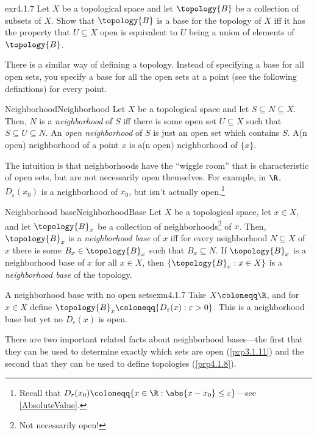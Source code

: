 \begin{exr}{}{exr4.1.7}
Let $X$ be a topological space and let $\topology{B}$ be a collection of subsets of $X$.  Show that $\topology{B}$ is a base for the topology of $X$ iff it has the property that $U\subseteq X$ open is equivalent to $U$ being a union of elements of $\topology{B}$.
\end{exr}
There is a similar way of defining a topology.  Instead of specifying a base for all open sets, you specify a base for all the open sets at a point (see the following definitions) for every point.
\begin{dfn}{Neighborhood}{Neighborhood}
Let $X$ be a topological space and let $S\subseteq N\subseteq X$.  Then, $N$ is a \emph{neighborhood} of $S$ iff there is some open set $U\subseteq X$ such that $S\subseteq U\subseteq N$.  An \emph{open neighborhood} of $S$ is just an open set which contains $S$.  A(n open) neighborhood of a point $x$ is a(n open) neighborhood of $\{ x\}$.
\begin{rmk}
The intuition is that neighborhoods have the ``wiggle room'' that is characteristic of open sets, but are not necessarily open themselves.  For example, in $\R$, $D_{\varepsilon}(x_0)$ is a neighborhood of $x_0$, but isn't actually open.\footnote{Recall that $D_{\varepsilon}(x_0)\coloneqq \{ x\in \R :\abs{x-x_0}\leq \varepsilon \}$---see \cref{AbsoluteValue}.}
\end{rmk}
\end{dfn}
\begin{dfn}{Neighborhood base}{NeighborhoodBase}
Let $X$ be a topological space, let $x\in X$, and let $\topology{B}_x$ be a collection of neighborhoods\footnote{Not necessarily open!} of $x$.  Then, $\topology{B}_x$ is a \emph{neighborhood base} of $x$ iff for every neighborhood $N\subseteq X$ of $x$ there is some $B_x\in \topology{B}_x$ such that $B_x\subseteq N$.  If $\topology{B}_x$ is a neighborhood base of $x$ for all $x\in X$, then $\{ \topology{B}_x:x\in X\}$ is a \emph{neighborhood base} of the topology.
\end{dfn}
\begin{exm}{A neighborhood base with no open sets}{exm4.1.7}
Take $X\coloneqq \R$, and for $x\in X$ define $\topology{B}_x\coloneqq \{ D_{\varepsilon}(x):\varepsilon >0\}$.  This is a neighborhood base but yet no $D_{\varepsilon}(x)$ is open.
\end{exm}
There are two important related facts about neighborhood bases---the first that they can be used to determine exactly which sets are open (\cref{prp3.1.11}) and the second that they can be used to define topologies (\cref{prp4.1.8}).
